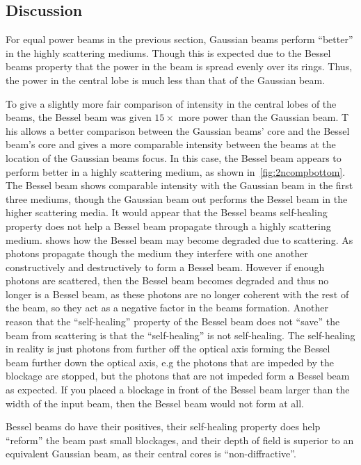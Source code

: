 \FloatBarrier


\subsection{Discussion}

For equal power beams in the previous section, Gaussian beams perform ``better'' in the highly scattering mediums.
Though this is expected due to the Bessel beams property that the power in the beam is spread evenly over its rings.
Thus, the power in the central lobe is much less than that of the Gaussian beam.

To give a slightly more fair comparison of intensity in the central lobes of the beams, the Bessel beam was given $15\times$ more power than the Gaussian beam. T
his allows a better comparison between the Gaussian beams' core and the Bessel beam's core and gives a more comparable intensity between the beams at the location of the Gaussian beams focus.
In this case, the Bessel beam appears to perform better in a highly scattering medium, as shown in~\cref{fig:2ncompbottom}.
The Bessel beam shows comparable intensity with the Gaussian beam in the first three mediums, though the Gaussian beam out performs the Bessel beam in the higher scattering media.
It would appear that the Bessel beams self-healing property does not help a Bessel beam propagate through a highly scattering medium.
 shows how the Bessel beam may become degraded due to scattering.
As photons propagate though the medium they interfere with one another constructively and destructively to form a Bessel beam.
However if enough photons are scattered, then the Bessel beam becomes degraded and thus no longer is a Bessel beam, as these photons are no longer coherent with the rest of the beam, so they act as a negative factor in the beams formation.
Another reason that the ``self-healing'' property of the Bessel beam does not ``save'' the beam from scattering is that the ``self-healing'' is not self-healing.
The self-healing in reality is just photons from further off the optical axis forming the Bessel beam further down the optical axis, e.g the photons that are impeded by the blockage are stopped, but the photons that are not impeded form a Bessel beam as expected.
If you placed a blockage in front of the Bessel beam larger than the width of the input beam, then the Bessel beam would not form at all.

Bessel beams do have their positives, their self-healing property does help ``reform'' the beam past small blockages, and their depth of field is superior to an equivalent Gaussian beam, as their central cores is ``non-diffractive''.


